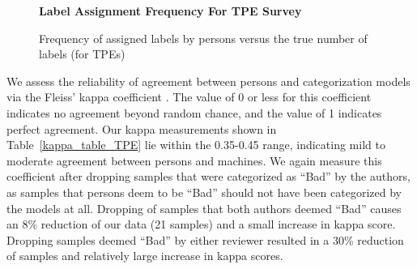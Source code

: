 \documentclass[\main/thesis.tex]{subfiles}
\begin{document}
\begin{figure}[tbp]
    \begin{center}
    \textbf{Label Assignment Frequency For TPE Survey}
    \end{center}
    \caption{Frequency of assigned labels by persons versus the true number of labels (for TPEs)}
\label{fig:freq-survey-2p}
\end{figure}
We assess the reliability of agreement between persons and categorization models via the Fleiss' kappa coefficient \cite{fleiss1971measuring}. The value of 0 or less for this coefficient indicates no agreement beyond random chance, and the value of 1 indicates perfect agreement. Our kappa measurements shown in Table~\ref{kappa_table_TPE} lie within the 0.35-0.45 range, indicating mild to moderate agreement between persons and machines. We again measure this coefficient after dropping samples that were categorized as \enquote{Bad} by the authors, as samples that persons deem to be \enquote{Bad} should not have been categorized by the models at all. Dropping of samples that both authors deemed \enquote{Bad} causes an 8\% reduction of our data (21 samples) and a small increase in kappa score. Dropping samples deemed \enquote{Bad} by either reviewer resulted in a 30\% reduction of samples and relatively large increase in kappa scores. 
\begin{table}[tbp]
\caption{\label{kappa_table_TPE}Table of Fleiss' kappa coefficients to measure the degree of agreement between persons (HvH) and various TPEs: persons with FC model (H+FC), persons with CNNLSTM model, persons with all models (H+E/F), and between the 3 models. \enquote{Drop Rule} column indicates if any samples were dropped. We show the measurements after dropping samples if they are deemed bad by either or both responders. We also show measurements after dropping the \enquote{other} category along with samples deemed bad by either responder. }
\end{table}
\end{document}
